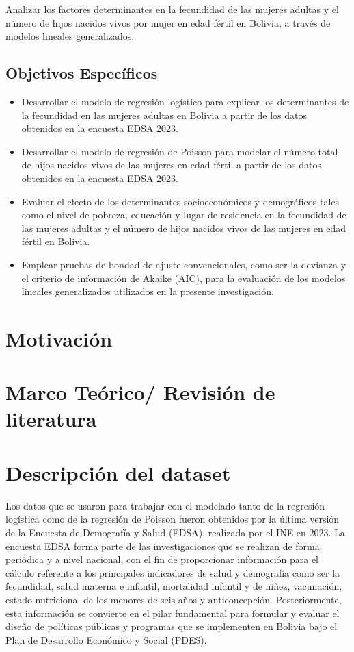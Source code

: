 \documentclass[Royal,times,sageh]{sagej}
\begin{document}
Analizar los factores determinantes en la fecundidad de las mujeres
adultas y el número de hijos nacidos vivos por mujer en edad fértil en
Bolivia, a través de modelos lineales generalizados.

\subsection{Objetivos Específicos}\label{objetivos-especuxedficos}

\begin{itemize}
\item
  Desarrollar el modelo de regresión logístico para explicar los
  determinantes de la fecundidad en las mujeres adultas en Bolivia a
  partir de los datos obtenidos en la encuesta EDSA 2023.
\item
  Desarrollar el modelo de regresión de Poisson para modelar el número
  total de hijos nacidos vivos de las mujeres en edad fértil a partir de
  los datos obtenidos en la encuesta EDSA 2023.
\item
  Evaluar el efecto de los determinantes socioeconómicos y demográficos
  tales como el nivel de pobreza, educación y lugar de residencia en la
  fecundidad de las mujeres adultas y el número de hijos nacidos vivos
  de las mujeres en edad fértil en Bolivia.
\item
  Emplear pruebas de bondad de ajuste convencionales, como ser la
  devianza y el criterio de información de Akaike (AIC), para la
  evaluación de los modelos lineales generalizados utilizados en la
  presente investigación.
\end{itemize}

\section{Motivación}\label{motivaciuxf3n}

\section{Marco Teórico/ Revisión de
literatura}\label{marco-teuxf3rico-revisiuxf3n-de-literatura}

\section{Descripción del dataset}\label{descripciuxf3n-del-dataset}

Los datos que se usaron para trabajar con el modelado tanto de la
regresión logística como de la regresión de Poisson fueron obtenidos por
la última versión de la Encuesta de Demografía y Salud (EDSA), realizada
por el INE en 2023. La encuesta EDSA forma parte de las investigaciones
que se realizan de forma periódica y a nivel nacional, con el fin de
proporcionar información para el cálculo referente a los principales
indicadores de salud y demografía como ser la fecundidad, salud materna
e infantil, mortalidad infantil y de niñez, vacunación, estado
nutricional de los menores de seis años y anticoncepción.
Posteriormente, esta información se convierte en el pilar fundamental
para formular y evaluar el diseño de políticas públicas y programas que
se implementen en Bolivia bajo el Plan de Desarrollo Económico y Social
(PDES).
\end{document}
